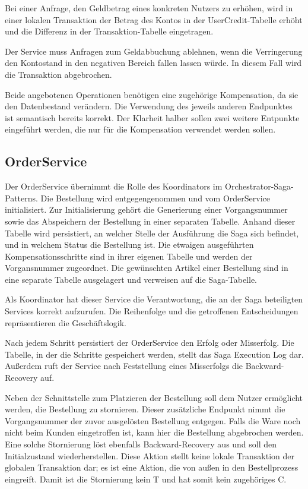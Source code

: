 Bei einer Anfrage, den Geldbetrag eines konkreten Nutzers zu erhöhen, wird in einer lokalen Transaktion der Betrag des Kontos in der UserCredit-Tabelle erhöht und die Differenz in der Transaktion-Tabelle eingetragen. 

Der Service muss Anfragen zum Geldabbuchung ablehnen, wenn die Verringerung den Kontostand in den negativen Bereich fallen lassen würde. In diesem Fall wird die Transaktion abgebrochen.

Beide angebotenen Operationen benötigen eine zugehörige Kompensation, da sie den Datenbestand verändern. Die Verwendung des jeweils anderen Endpunktes ist semantisch bereits korrekt. Der Klarheit halber sollen zwei weitere Entpunkte eingeführt werden, die nur für die Kompensation verwendet werden sollen.

\subsection{OrderService}
Der OrderService übernimmt die Rolle des Koordinators im Orchestrator-Saga-Patterns. Die Bestellung wird entgegengenommen und vom OrderService initialisiert. Zur Initialisierung gehört die Generierung einer Vorgangsnummer sowie das Abspeichern der Bestellung in einer separaten Tabelle. Anhand dieser Tabelle wird persistiert, an welcher Stelle der Ausführung die Saga sich befindet, und in welchem Status die Bestellung ist. Die etwaigen ausgeführten Kompensationsschritte sind in ihrer eigenen Tabelle und werden der Vorgansnummer zugeordnet. Die gewünschten Artikel einer Bestellung sind in eine separate Tabelle ausgelagert und verweisen auf die Saga-Tabelle. 

Als Koordinator hat dieser Service die Verantwortung, die an der Saga beteiligten Services korrekt aufzurufen. Die Reihenfolge und die getroffenen Entscheidungen repräsentieren die Geschäftslogik. 

Nach jedem Schritt persistiert der OrderService den Erfolg oder Misserfolg. Die Tabelle, in der die Schritte gespeichert werden, stellt das Saga Execution Log dar. Außerdem ruft der Service nach Feststellung eines Misserfolgs die Backward-Recovery auf. 

Neben der Schnittstelle zum Platzieren der Bestellung soll dem Nutzer ermöglicht werden, die Bestellung zu stornieren. Dieser zusätzliche Endpunkt nimmt die Vorgangsnummer der zuvor ausgelösten Bestellung entgegen. Falls die Ware noch nicht beim Kunden eingetroffen ist, kann hier die Bestellung abgebrochen werden. Eine solche Stornierung löst ebenfalls Backward-Recovery aus und soll den Initialzustand wiederherstellen. Diese Aktion stellt keine lokale Transaktion der globalen Transaktion dar; es ist eine Aktion, die von außen in den Bestellprozess eingreift. Damit ist die Stornierung kein T und hat somit kein zugehöriges C.

